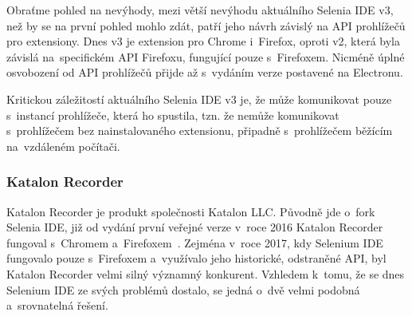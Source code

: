 \documentclass[12pt, a4paper, twoside]{article}
\begin{document}
	\noindent Obraťme pohled na nevýhody, mezi větší nevýhodu aktuálního Selenia IDE v3, než by se na první pohled mohlo zdát, patří jeho návrh závislý na API prohlížečů pro extensiony. Dnes v3 je extension pro Chrome i~Firefox, oproti v2, která byla závislá na~specifickém API Firefoxu, fungující pouze s~Firefoxem. Nicméně úplné osvobození od API prohlížečů přijde až s~vydáním verze postavené na Electronu.
	
	Kritickou záležitostí aktuálního Selenia IDE v3 je, že může komunikovat pouze s~instancí prohlížeče, která ho spustila, tzn. že nemůže komunikovat s~prohlížečem bez nainstalovaného extensionu, připadně s~prohlížečem běžícím na~vzdáleném počítači.
	\subsubsection{Katalon Recorder}
	Katalon Recorder je produkt společnosti Katalon LLC. Původně jde o~fork Selenia IDE, již od vydání první veřejné verze v~roce 2016 Katalon Recorder fungoval s~Chromem a~Firefoxem~\cite{katalonRecorderMainPage, katalonRecorderWikipedia}. Zejména v~roce 2017, kdy Selenium IDE fungovalo pouze s~Firefoxem a~využívalo jeho historické, odstraněné API, byl Katalon Recorder velmi silný významný konkurent. Vzhledem k~tomu, že se dnes Selenium IDE ze svých problémů dostalo, se jedná o~dvě velmi podobná a~srovnatelná řešení.
\end{document}
